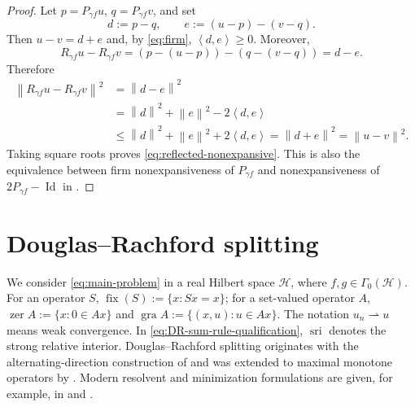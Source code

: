 \documentclass[10pt,leqno]{amsart}
\numberwithin{equation}{section}
\numberwithin{algorithm}{section}
\theoremstyle{remark}
\newcommand{\Hcal}{\mathcal{H}}
\newcommand{\Id}{\operatorname{Id}}
\newcommand{\Fix}{\operatorname{fix}}
\newcommand{\norm}[1]{\left\lVert #1 \right\rVert}
\newcommand{\ip}[2]{\left\langle #1,#2 \right\rangle}
\begin{document}
\begin{proof}
Let $p=P_{\gamma f}u$, $q=P_{\gamma f}v$, and set
\[
  d:=p-q,
  \qquad
  e:=(u-p)-(v-q).
\]
Then $u-v=d+e$ and, by \eqref{eq:firm}, $\ip{d}{e}\ge0$.  Moreover,
\[
  R_{\gamma f}u-R_{\gamma f}v
  =(p-(u-p))-(q-(v-q))=d-e.
\]
Therefore
\begin{align*}
  \norm{R_{\gamma f}u-R_{\gamma f}v}^2
  &=\norm{d-e}^2\\
  &=\norm d^2+\norm e^2-2\ip d e\\
  &\le \norm d^2+\norm e^2+2\ip d e
   =\norm{d+e}^2
   =\norm{u-v}^2.
\end{align*}
Taking square roots proves \eqref{eq:reflected-nonexpansive}.  This is also the equivalence between firm nonexpansiveness of $P_{\gamma f}$ and nonexpansiveness of $2P_{\gamma f}-\Id$ in \cite[Prop.~4.4]{BauschkeCombettes2017}.
\end{proof}

\section{Douglas--Rachford splitting}
\label{app:exact-drs}

We consider \eqref{eq:main-problem} in a real Hilbert space $\Hcal$, where $f,g\in\Gamma_0(\Hcal)$.  For an operator $S$, $\Fix(S):=\{x:Sx=x\}$; for a set-valued operator $A$, $\operatorname{zer}A:=\{x:0\in Ax\}$ and $\operatorname{gra}A:=\{(x,u):u\in Ax\}$.  The notation $u_n\rightharpoonup u$ means weak convergence.  In \eqref{eq:DR-sum-rule-qualification}, $\operatorname{sri}$ denotes the strong relative interior.  Douglas--Rachford splitting originates with the alternating-direction construction of \cite{DouglasRachford1956} and was extended to maximal monotone operators by \cite{LionsMercier1979}.  Modern resolvent and minimization formulations are given, for example, in \cite[Secs.~26.3 and 28.3]{BauschkeCombettes2017} and \cite{CombettesPesquet2011}.
\end{document}
